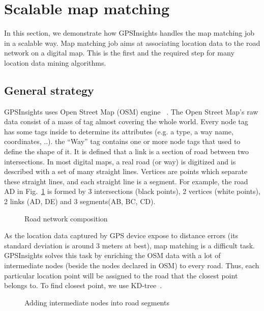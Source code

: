\documentclass{acm_proc_article-sp}
\begin{document}
\section{Scalable map matching}

In this section, we demonstrate how GPSInsights handles the map matching job in a scalable way. Map matching job aims at associating location data to the road network on a digital map. This is the first and the required step for many location data mining algorithms. 
	
\subsection{General strategy} \label{ssec:links}

GPSInsights uses Open Street Map (OSM) engine ~\cite{openstreetmap}. The Open Street Map's raw data consist of a mass of tag almost covering the whole world. Every node tag has some tags inside to determine its attributes (e.g. a type, a way name, coordinates, ..). the ``Way'' tag contains one or more node tags that used to define the shape of it. It is defined that a link is a section of road between two intersections. In most digital maps, a real road (or way) is digitized and is described with a set of many straight lines. Vertices are points which separate these straight lines, and each straight line is a segment. For example, the road AD in Fig.~\ref{fig:composition} is formed by 3 intersections (black points), 2 vertices (white points), 2 links (AD, DE) and 3 segments(AB, BC, CD).
		
\begin{figure}[h]
\centering
{}
\caption{Road network composition}
\label{fig:composition}
\end{figure}
	
As the location data captured by GPS device expose to distance errors (its standard deviation is around 3 meters at best), map matching is a difficult task. GPSInsights solves this task by enriching the OSM data with a lot of intermediate nodes (beside the nodes declared in OSM) to every road. Thus, each particular location point will be assigned to the road that the closest point belongs to. To find closest point, we use KD-tree~\cite{moh2013approximate}. 

	
\begin{figure}[h]
\centering
{}
\caption{Adding intermediate nodes into road segments}
\label{fig:addPointsToRoad}
\end{figure}
	
\end{document}
